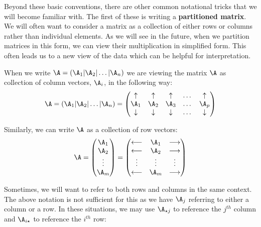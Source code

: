 \documentclass[
]{article}
\theoremstyle{definition}
\theoremstyle{definition}
\theoremstyle{definition}
\theoremstyle{definition}
\theoremstyle{remark}
\begin{document}
Beyond these basic conventions, there are other common notational tricks that we will become familiar with. The first of these is writing a \textbf{partitioned matrix}. We will often want to consider a matrix as a collection of either rows or columns rather than individual elements. As we will see in the future, when we partition matrices in this form, we can view their multiplication in simplified form. This often leads us to a new view of the data which can be helpful for interpretation.

When we write \(\A=( \A_1 | \A_2 | \dots | \A_n )\) we are viewing the matrix \(\A\) as collection of column vectors, \(\A_i\), in the following way:
\[\A=( \A_1 | \A_2 | \dots | \A_n )=\left(\begin{matrix} \uparrow & \uparrow &\uparrow&\dots & \uparrow \\
            \A_1&\A_2&\A_3&\dots&\A_p \\
            \downarrow &\downarrow &\downarrow &\dots&\downarrow   \end{matrix}\right) \]

Similarly, we can write \(\A\) as a collection of row vectors:
\[\A=\left(\begin{matrix} \A_1 \\ \A_2 \\ \vdots \\  \A_m \end{matrix}\right) = 
\left(\begin{matrix} \longleftarrow & \A_1 & \longrightarrow \\
 \longleftarrow & \A_2 & \longrightarrow \\
  \vdots & \vdots & \vdots \\
   \longleftarrow & \A_m & \longrightarrow \end{matrix}\right)\]

Sometimes, we will want to refer to both rows and columns in the same context. The above notation is not sufficient for this as we have \(\A_j\) referring to either a column or a row. In these situations, we may use
\(\A_{\star j}\) to reference the \(j^{th}\) column and \(\A_{i \star}\) to reference the \(i^{th}\) row:
\end{document}
